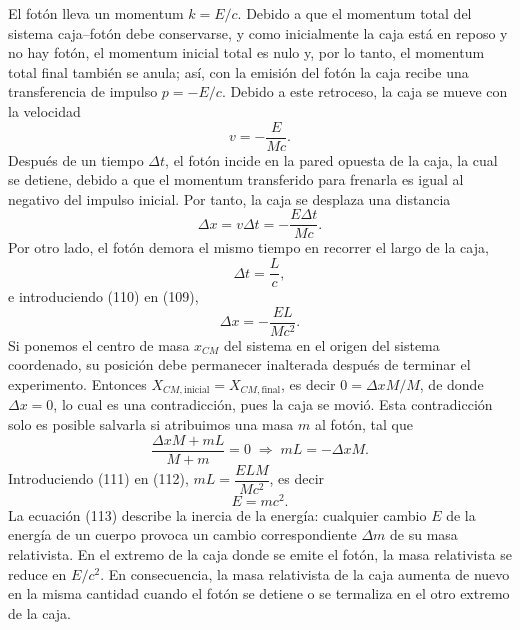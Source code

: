 El fotón lleva un momentum $k=E/c$. Debido a que el momentum total del
sistema caja--fotón debe conservarse, y como inicialmente la caja está
en reposo y no hay fotón, el momentum inicial total es nulo y, por lo
tanto, el momentum total final también se anula; así, con la emisión del
fotón la caja recibe una transferencia de impulso $p=-E/c$. Debido a este
retroceso, la caja se mueve con la velocidad
\[
v = -\frac{E}{Mc} . \tag{108}
\]
Después de un tiempo $\Delta t$, el fotón incide en la pared opuesta de la
caja, la cual se detiene, debido a que el momentum transferido para
frenarla es igual al negativo del impulso inicial. Por tanto, la caja se
desplaza una distancia
\[
\Delta x = v\Delta t = -\frac{E\Delta t}{Mc} . \tag{109}
\]
Por otro lado, el fotón demora el mismo tiempo en recorrer el largo de
la caja,
\[
\Delta t = \frac Lc , \tag{110}
\]
e introduciendo (110) en (109),
\[
\Delta x = -\frac{EL}{Mc^2} . \tag{111}
\]
Si ponemos el centro de masa $x_{CM}$ del sistema en el origen del
sistema coordenado, su posición debe permanecer inalterada después de
terminar el experimento. Entonces $X_{CM,\text{inicial}}=X_{CM,
\text{final}}$, es decir $0=\Delta xM/M$, de donde $\Delta x=0$, lo cual
es una contradicción, pues la caja se movió. Esta contradicción solo es
posible salvarla si atribuimos una masa $m$ al fotón, tal que
\[
\frac{\Delta xM+mL}{M+m} = 0 \;\Longrightarrow\; mL = -\Delta xM .
\tag{112}
\]
Introduciendo (111) en (112), $mL=\dfrac{ELM}{Mc^2}$, es decir
\[
E = mc^2 . \tag{113}
\]
La ecuación (113) describe la inercia de la energía: cualquier cambio $E$
de la energía de un cuerpo provoca un cambio correspondiente $\Delta m$
de su masa relativista. En el extremo de la caja donde se emite el fotón,
la masa relativista se reduce en $E/c^2$. En consecuencia, la masa
relativista de la caja aumenta de nuevo en la misma cantidad cuando el
fotón se detiene o se termaliza en el otro extremo de la caja.
